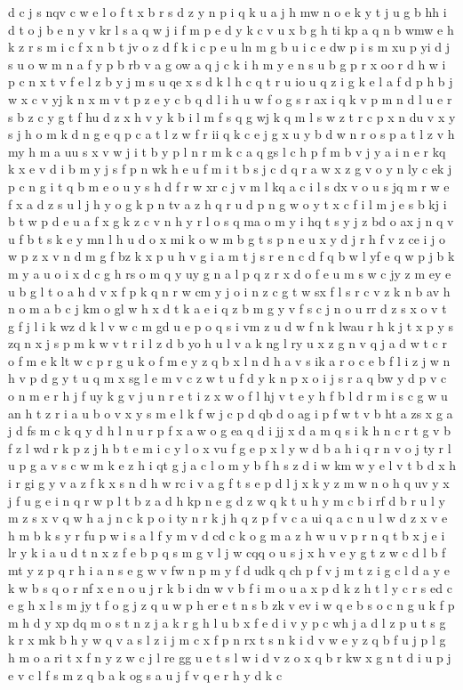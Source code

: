 \documentclass{article}
\begin{document}
d c j s nqv c w e l o f t x b r s d z y n p i q k u a j h mw n o e k y t j u g b hh i d t o j b e n y v kr l s a q w j i f m p e d y k c v u x b g h ti kp a q n b wmw e h k z r s m i c f x n b t jv o z d f k i c p e u ln m g b u i c e dw p i s m xu p yi d j s u o w m n a f y p b rb v a g ow a q j c k i h m y e n s u b g p r x oo r d h w i p c n x t v f e l z b y j m s u qe x s d k l h c q t r u io u q z i g k e l a f d p h b j w x c v yj k n x m v t p z e y c b q d l i h u w f o g s r ax i q k v p m n d l u e r s b z c y g t f hu d z x h v y k b i l m f s q g wj k q m l s w z t r c p x n du v x y s j h o m k d n g e q p c a t l z w f r ii q k c e j g x u y b d w n r o s p a t l z v h my h m a uu s x v w j i t b y p l n r m k c a q gs l c h p f m b v j y a i n e r kq k x e v d i b m y j s f p n wk h e u f m i t b s j c d q r a w x z g v o y n ly c ek j p c n g i t q b m e o u y s h d f r w xr c j v m l kq a c i l s dx v o u s jq m r w e f x a d z s u l j h y o g k p n tv a z h q r u d p n g w o y t x c f i l m j e s b kj i b t w p d e u a f x g k z c v n h y r l o s q ma o m y i hq t s y j z bd o ax j n q v u f b t s k e y mn l h u d o x mi k o w m b g t s p n e u x y d j r h f v z ce i j o w p z x v n d m g f bz k x p u h v g i a m t j s r e n c d f q b w l yf e q w p j b k m y a u o i x d c g h rs o m q y uy g n a l p q z r x d o f e u m s w c jy z m ey e u b g l t o a h d v x f p k q n r w cm y j o i n z c g t w sx f l s r c v z k n b av h n o m a b c j km o gl w h x d t k a e i q z b m g y v f s c j n o u rr d z s x o v t g f j l i k wz d k l v w c m gd u e p o q s i vm z u d w f n k lwau r h k j t x p y s zq n x j s p m k w v t r i l z d b yo h u l v a k ng l ry u x z g n v q j a d w t c r o f m e k lt w c p r g u k o f m e y z q b x l n d h a v s ik a r o c e b f l i z j w n h v p d g y t u q m x sg l e m v c z w t u f d y k n p x o i j s r a q bw y d p v c o n m e r h j f uy k g v j u n r e t i z x w o f l hj v t e y h f b l d r m i s c g w u an h t z r i a u b o v x y s m e l k f w j c p d qb d o ag i p f w t v b ht a zs x g a j d fs m c k q y d h l n u r p f x a w o g ea q d i jj x d a m q s i k h n c r t g v b f z l wd r k p z j h b t e m i c y l o x vu f g e p x l y w d b a h i q r n v o j ty r l u p g a v s c w m k e z h i qt g j a c l o m y b f h s z d i w km w y e l v t b d x h i r gi g y v a z f k x s n d h w rc i v a g f t s e p d l j x k y z m w n o h q uv y x j f u g e i n q r w p l t b z a d h kp n e g d z w q k t u h y m c b i rf d b r u l y m z s x v q w h a j n c k p o i ty n r k j h q z p f v c a ui q a c n u l w d z x v e h m b k s y r fu p w i s a l f y m v d cd c k o g m a z h w u v p r n q t b x j e i lr y k i a u d t n x z f e b p q s m g v l j w cqq o u s j x h v e y g t z w c d l b f mt y z p q r h i a n s e g w v fw n p m y f d udk q ch p f v j m t z i g c l d a y e k w b s q o r nf x e n o u j r k b i dn w v b f i m o u a x p d k z h t l y c r s ed c e g h x l s m jy t f o g j z q u w p h er e t n s b zk v ev i w q e b s o c n g u k f p m h d y xp dq m o s t n z j a k r g h l u b x f e d i v y p c wh j a d l z p u t s g k r x mk b h y w q v a s l z i j m c x f p n rx t s n k i d v w e y z q b f u j p l g h m o a ri t x f n y z w c j l re gg u e t s l w i d v z o x q b r kw x g n t d i u p j e v c l f s m z q b a k og s a u j f v q e r h y d k c 
\end{document}
